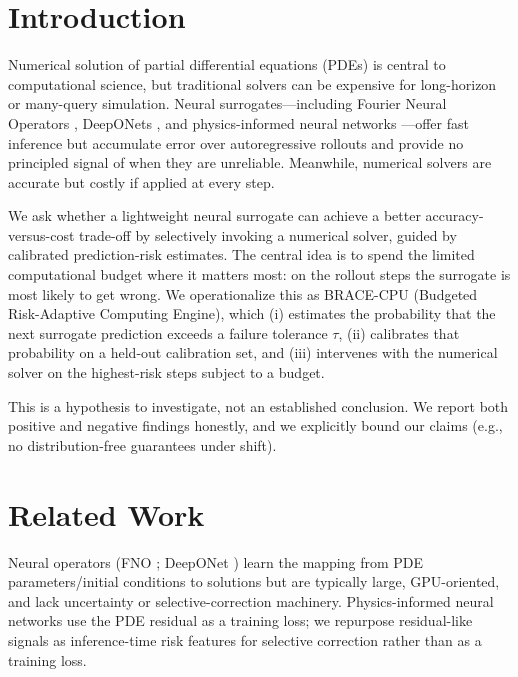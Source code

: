 \documentclass[11pt]{article}
\begin{document}
\section{Introduction}
Numerical solution of partial differential equations (PDEs) is central to computational science, but traditional solvers can be expensive for long-horizon or many-query simulation. Neural surrogates---including Fourier Neural Operators \citep{li2020fourier}, DeepONets \citep{lu2021deeponet}, and physics-informed neural networks \citep{raissi2019physics}---offer fast inference but accumulate error over autoregressive rollouts and provide no principled signal of when they are unreliable. Meanwhile, numerical solvers are accurate but costly if applied at every step.

We ask whether a lightweight neural surrogate can achieve a better accuracy-versus-cost trade-off by selectively invoking a numerical solver, guided by calibrated prediction-risk estimates. The central idea is to spend the limited computational budget where it matters most: on the rollout steps the surrogate is most likely to get wrong. We operationalize this as BRACE-CPU (Budgeted Risk-Adaptive Computing Engine), which (i) estimates the probability that the next surrogate prediction exceeds a failure tolerance $\tau$, (ii) calibrates that probability on a held-out calibration set, and (iii) intervenes with the numerical solver on the highest-risk steps subject to a budget.

This is a hypothesis to investigate, not an established conclusion. We report both positive and negative findings honestly, and we explicitly bound our claims (e.g., no distribution-free guarantees under shift).

\section{Related Work}
\label{sec:related}
Neural operators (FNO \citep{li2020fourier}; DeepONet \citep{lu2021deeponet}) learn the mapping from PDE parameters/initial conditions to solutions but are typically large, GPU-oriented, and lack uncertainty or selective-correction machinery. Physics-informed neural networks \citep{raissi2019physics} use the PDE residual as a training loss; we repurpose residual-like signals as inference-time risk features for selective correction rather than as a training loss.
\end{document}
